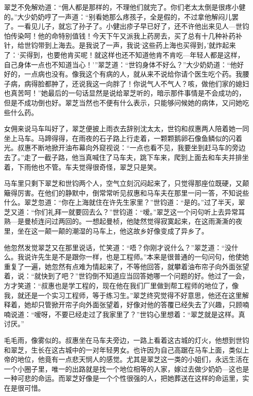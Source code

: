 \par 翠芝不免解劝道：“佣人都是那样的，不理他们就完了。你们老太太倒是很疼小健的。”大少奶奶哼了一声道：“别看她那么疼孩子，全是假的，不过拿他解闷儿罢了。一看见儿子，就忘了孙子了。小健出疹子早已好了，还不许他出来见人—世钧怕传染呵！他的命特别值钱！今天下午又派我上药房去，买了总有十几种补药补针，给世钧带到上海去。是我说了一声，我说‘这些药上海也买得到，’就炸起来了：‘买得到，也要他肯买呢！就这样也还不知道他肯不肯吃—年轻人都是这样，自己身体一点也不知道当心！’”翠芝道：“世钧身体不好么？”大少奶奶道：“他好好的，一点病也没有。像我这个有病的人，就从来不说给你请个医生吃个药。我腰子病，病得脸都肿了，还说我这一向胖了！你说气人不气人？咳，做他们家的媳妇也真苦呵！”她最后的一句话显然是说给翠芝听的，暗示那件事情是不会成功的，但是不成功倒也好。翠芝当然也不便有什么表示，只能够问候她的病体，又问她吃些什么药。
\par 女佣来说马车叫好了，翠芝便披上雨衣去辞别沈太太，世钧和叔惠两人陪着她一同坐上马车。马蹄得得，在雨夜的石子路上行走着，一颗颗鹅卵石像鱼鳞似的闪着光。叔惠不断地掀开油布幕向外窥视说：“一点也看不见，我要坐到赶马车的旁边去了。”走了一截子路，他当真喊住了马车夫，跳下车来，爬到上面去和车夫并排坐着，下雨他也不管。车夫觉得很奇怪，翠芝只是笑。
\par 马车里只剩下翠芝和世钧两个人，空气立刻沉闷起来了，只觉得那座位既硬，又颠簸得厉害。在他们的静默中，倒常常听见叔惠和马车夫在那里一问一答，不知说些什么。翠芝忽道：“你在上海就住在许先生家里？”世钧道：“是的。”过了半天，翠芝又道：“你们礼拜一就要回去么？”世钧道：“嗳。”翠芝这一个问句听上去异常耳熟—是曼桢连问过两回的。一想起曼桢，他陡然觉得寂寞起来，在这雨澌澌的夜里，坐在这一颠一颠的潮湿的马车上，他这故乡好像变成了异乡了。
\par 他忽然发觉翠芝又在那里说话，忙笑道：“唔？你刚才说什么？”翠芝道：“没什么。我说许先生是不是跟你一样，也是工程师。”本来是很普通的一句问句，他使她重复了一遍，她忽然有点难为情起来了，不等他回答，就攀着油布帘子向外面张望着，说：“就快到了吧？”世钧倒不知道应当回答她哪一个问题的好。他过了一会，方才笑道：“叔惠也是学工程的，现在他在我们厂里做到帮工程师的地位了，像我，就还是一个实习工程师，等于练习生。”翠芝终究觉得不好意思，他还在这里解释着，她却只管掀开帘子向外面张望着，好像对他的答覆已经失去了兴趣，只顾喃喃说道：“嗳呀，不要已经走过了我家里了？”世钧心里想着：“翠芝就是这样。真讨厌。”
\par 毛毛雨，像雾似的。叔惠坐在马车夫旁边，一路上看着这古城的灯火，他想到世钧和翠芝，生长在这古城中的一对年轻男女。也许因为自己高踞在马车上面，类似上帝的地位，他竟有一点悲天悯人的感觉。尤其是翠芝这一类的小姐们，永远生活在一个小圈子里，唯一的出路就是找一个地位相等的人家，嫁过去做少奶奶—这也是一种可悲的命运。而翠芝好像是一个个性很强的人，把她葬送在这样的命运里，实在是很可惜。
